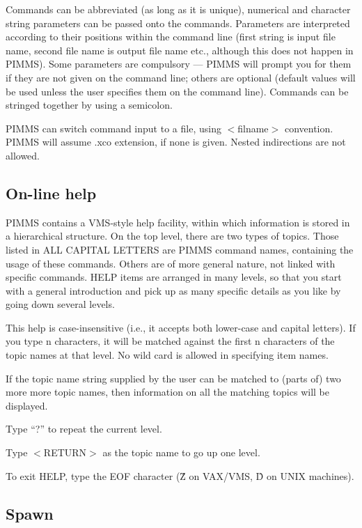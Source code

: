 Commands  can  be  abbreviated  (as  long  as it  is  unique),  numerical  and
character  string  parameters can  be passed onto  the commands.    Parameters
are  interpreted  according   to  their  positions  within  the  command  line 
(first string is input file name,  second file name is  output file name etc.,
although this does  not happen in PIMMS).   Some parameters  are compulsory 
--- PIMMS  will prompt  you  for  them if they are not given on the 
command line;
others are optional  (default values will  be used unless  the user  specifies
them  on the  command  line).   Commands can  be stringed  together by using a
semicolon.

PIMMS can switch command input to a file, using \@$<$filname$>$ convention.
PIMMS will assume .xco extension, if none is given.  Nested indirections
are not allowed.

\subsection{On-line help}

PIMMS contains a VMS-style help facility, within which
information is  stored in a hierarchical structure.   On the top level,
there are two types of topics.   Those listed in ALL CAPITAL LETTERS are PIMMS
command names,  containing the usage  of these commands.    Others are of more
general nature, not linked with specific commands.  HELP items are arranged in
many levels, so that you start with a general introduction and pick up as many
specific details as you like by going down several levels.

This help is case-insensitive  (i.e., it accepts both lower-case and capital
letters).   If you type n characters,  it will be matched against  the first
n characters of  the topic names at that level.   No wild card is allowed in
specifying item names.

If the topic name
string supplied by the user  can be matched to (parts of) two more more
topic names, then information on all the matching topics will be displayed.

Type ``?'' to repeat the current level.

Type $<$RETURN$>$ as the topic name to go up one level.

To exit HELP, type the EOF character (\^Z on VAX/VMS, \^D on UNIX machines).

\subsection{Spawn}

